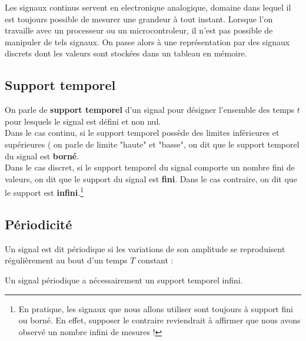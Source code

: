 Les signaux continus servent en electronique analogique, domaine dans lequel il est toujours possible de mesurer une grandeur à tout instant. Lorsque l'on travaille avec un processeur ou un microcontroleur, il n'est pas possible de manipuler de tels signaux. On passe alors à une représentation par des signaux discrets dont les valeurs sont stockées dans un tableau en mémoire. 

\subsection{Support temporel}

On parle de \textbf{support temporel} d'un signal pour désigner l'ensemble des temps $t$ pour lesquels le signal est défini et non nul. \\

Dans le cas continu, si le support temporel possède des limites inférieures et supérieures ( on parle de limite "haute" et "basse", on dit que le support temporel du signal est \textbf{borné}. \\

Dans le cas discret, si le support temporel du signal comporte un nombre fini de valeurs, on dit que le support du signal est \textbf{fini}. Dans le cas contraire, on dit que le support est \textbf{infini}.\footnote{En pratique, les signaux que nous allons utiliser sont toujours à support fini ou borné. En effet, supposer le contraire reviendrait à affirmer que nous avons observé un nombre infini de mesures !}

\subsection{Périodicité}

Un signal est dit périodique si les variations de son amplitude se reproduisent régulièrement au bout d'un temps $T$ constant : \\


\begin{center}

\end{center}

Un signal périodique a nécessairement un support temporel infini. \\

